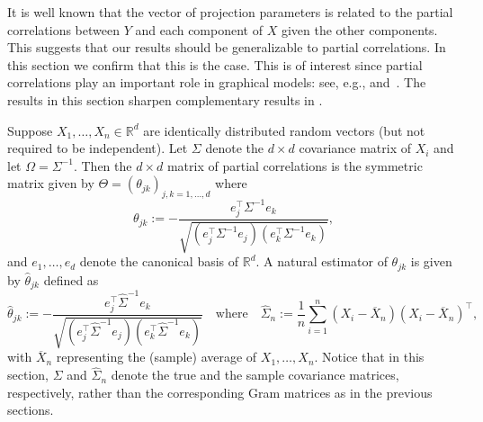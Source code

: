 \documentclass[11pt]{article}
\begin{document}
It is well known that the vector of projection parameters is related to the
partial correlations between $Y$ and each component of $X$ given
the other components.
This suggests that our results should be generalizable to
partial correlations.
In this section we confirm that this is the case.
This is of interest since partial correlations
play an important role in graphical models: see, e.g., \cite{Lau96} and~\cite{drton2004model}. The results in this section sharpen complementary results in \cite{wasserman2014berry}. 


Suppose $X_1, \ldots, X_n\in\mathbb{R}^d$ are identically distributed random vectors (but not required to be independent). Let $\Sigma$ denote the $d\times d$ covariance matrix of $X_i$ and let $\Omega = \Sigma^{-1}.$ Then the $d \times d$ matrix of partial correlations is the symmetric matrix given by $\Theta = (\theta_{jk})_{j,k=1,\ldots,d}$ where
\[
\theta_{jk} := -\frac{e_j^{\top}\Sigma^{-1}e_k}{\sqrt{(e_j^{\top}\Sigma^{-1}e_j)(e_k^{\top}\Sigma^{-1}e_k)}},
\]
and $e_1, \ldots, e_d$ denote the canonical basis of $\mathbb{R}^d$. A natural estimator of $\theta_{jk}$ is given by $\widehat{\theta}_{jk}$ defined as
\[
\widehat{\theta}_{jk} := -\frac{e_j^{\top}\widehat{\Sigma}^{-1}e_k}{\sqrt{(e_j^{\top}\widehat{\Sigma}^{-1}e_j)(e_k^{\top}\widehat{\Sigma}^{-1}e_k)}}\quad\mbox{where}\quad \widehat{\Sigma}_n := \frac{1}{n}\sum_{i=1}^n (X_i - \overline{X}_n)(X_i - \overline{X}_n)^{\top},
\]
with $\overline{X}_n$ representing the (sample) average of $X_1, \ldots, X_n$. Notice that in this section, $\Sigma$ and $\widehat{\Sigma}_n$ denote the true and the sample covariance matrices, respectively,  rather than the corresponding Gram matrices as in the previous sections.
\end{document}

